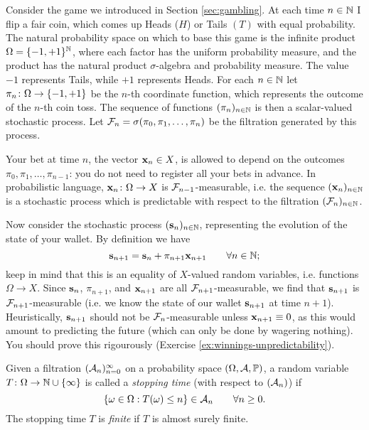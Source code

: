\begin{example}\label{eg:gambling-filtrations}
  Consider the game we introduced in Section \ref{sec:gambling}.
  At each time $n \in \mathbb{N}$ I flip a fair coin, which comes up Heads ($H$) or Tails $(T)$ with equal probability.
  The natural probability space on which to base this game is the infinite product $\Omega = \{-1,+1\}^{\mathbb{N}}$, where each factor has the uniform probability measure, and the product has the natural product $\sigma$-algebra and probability measure.
  The value $-1$ represents Tails, while $+1$ represents Heads.
  For each $n \in \mathbb{N}$ let $\pi_n \colon \Omega \rightarrow \{-1,+1\}$ be the $n$-th coordinate function, which represents the outcome of the $n$-th coin toss.
  The sequence of functions $(\pi_n)_{n \in \mathbb{N}}$ is then a scalar-valued stochastic process.
  Let $\mathcal{F}_n = \sigma(\pi_0,\pi_1,\ldots,\pi_n)$ be the filtration generated by this process.

  
  Your bet at time $n$, the vector $\mathbf{x}_n \in X$, is allowed to depend on the outcomes $\pi_0, \pi_1, \ldots, \pi_{n-1}$: you do not need to register all your bets in advance.
  In probabilistic language, $\mathbf{x}_n \colon \Omega \rightarrow X$ is $\mathcal{F}_{n-1}$-measurable, i.e. the sequence $(\mathbf{x}_n)_{n \in \mathbb{N}}$ is a stochastic process which is predictable with respect to the filtration $(\mathcal{F}_n)_{n \in \mathbb{N}}$.

  Now consider the stochastic process $(\mathbf{s}_n)_{n \in \mathbb{N}}$, representing the evolution of the state of your wallet.
  By definition we have
  \begin{equation*}
    \mathbf{s}_{n+1} = \mathbf{s}_n + \pi_{n+1} \mathbf{x}_{n+1} \qquad \forall n \in \mathbb{N};
  \end{equation*}
  keep in mind that this is an equality of $X$-valued random variables, i.e. functions $\Omega \to X$.
  Since $\mathbf{s}_n$, $\pi_{n+1}$, and $\mathbf{x}_{n+1}$ are all $\mathcal{F}_{n+1}$-measurable, we find that $\mathbf{s}_{n+1}$ is $\mathcal{F}_{n+1}$-measurable (i.e. we know the state of our wallet $\mathbf{s}_{n+1}$ at time $n+1$).
  Heuristically, $\mathbf{s}_{n+1}$ should not be $\mathcal{F}_n$-measurable unless $\mathbf{x}_{n+1} \equiv 0$, as this would amount to predicting the future (which can only be done by wagering nothing).
  You should prove this rigourously (Exercise \ref{ex:winnings-unpredictability}).
\end{example}


\begin{defn}
  Given a filtration $(\mathcal{A}_n)_{n=0}^\infty$ on a probability space $(\Omega, \mathcal{A}, \mathbb{P})$, a random variable $T \colon \Omega \rightarrow \mathbb{N} \cup \{\infty\}$ is called a \emph{stopping time} (with respect to $(\mathcal{A}_n)$) if 
  \begin{equation*}
    \{\omega \in \Omega: T(\omega) \leq n\} \in \mathcal{A}_n \qquad \forall n \geq 0.
  \end{equation*}
  The stopping time $T$ is \emph{finite} if $T$ is almost surely finite.
\end{defn}


